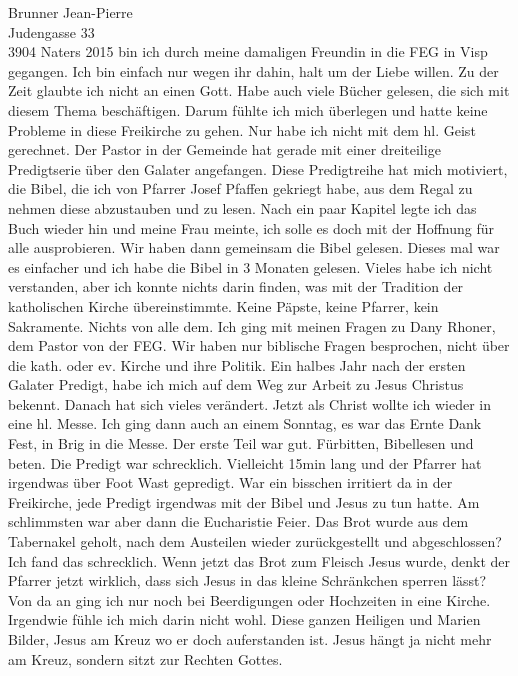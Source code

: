 \documentclass[
    12pt,
    a4paper,
    letter,
    parskip=yes,
    ]{scrlttr2}
\begin{document}
\begin{letter}{
Brunner Jean-Pierre\\
Judengasse 33\\
3904 Naters}
2015 bin ich durch meine damaligen Freundin in die FEG in Visp gegangen. Ich bin einfach nur wegen ihr dahin, halt um der Liebe willen. Zu der Zeit glaubte ich nicht an einen Gott. Habe auch viele Bücher gelesen, die sich mit diesem Thema beschäftigen. Darum fühlte ich mich überlegen und hatte keine Probleme in diese Freikirche zu gehen. Nur habe ich nicht mit dem hl. Geist gerechnet. Der Pastor in der Gemeinde hat gerade mit einer dreiteilige Predigtserie über den Galater angefangen. Diese Predigtreihe hat mich motiviert, die Bibel, die ich von Pfarrer Josef Pfaffen gekriegt habe, aus dem Regal zu nehmen diese abzustauben und zu lesen. Nach ein paar Kapitel legte ich das Buch wieder hin und meine Frau meinte, ich solle es doch mit der Hoffnung für alle ausprobieren. Wir haben dann gemeinsam die Bibel gelesen. Dieses mal war es einfacher und ich habe die Bibel in 3 Monaten gelesen. Vieles habe ich nicht verstanden, aber ich konnte nichts darin finden, was mit der Tradition der katholischen Kirche übereinstimmte. Keine Päpste, keine Pfarrer, kein Sakramente. Nichts von alle dem. Ich ging mit meinen Fragen zu Dany Rhoner, dem Pastor von der FEG. Wir haben nur biblische Fragen besprochen, nicht über die kath. oder ev. Kirche und ihre Politik. Ein halbes Jahr nach der ersten Galater Predigt, habe ich mich auf dem Weg zur Arbeit zu Jesus Christus bekennt. Danach hat sich vieles verändert. Jetzt als Christ wollte ich wieder in eine hl. Messe. Ich ging dann auch an einem Sonntag, es war das Ernte Dank Fest, in Brig in die Messe. Der erste Teil war gut. Fürbitten, Bibellesen und beten. Die Predigt war schrecklich. Vielleicht 15min lang und der Pfarrer hat irgendwas über Foot Wast gepredigt. War ein bisschen irritiert da in der Freikirche, jede Predigt irgendwas mit der Bibel und Jesus zu tun hatte. Am schlimmsten war aber dann die Eucharistie Feier. Das Brot wurde aus dem Tabernakel geholt, nach dem Austeilen wieder zurückgestellt und abgeschlossen? Ich fand das schrecklich. Wenn jetzt das Brot zum Fleisch Jesus wurde, denkt der Pfarrer jetzt wirklich, dass sich Jesus in das kleine Schränkchen sperren lässt? Von da an ging ich nur noch bei Beerdigungen oder Hochzeiten in eine Kirche. Irgendwie fühle ich mich darin nicht wohl. Diese ganzen Heiligen und Marien Bilder, Jesus am Kreuz wo er doch auferstanden ist. Jesus hängt ja nicht mehr am Kreuz, sondern sitzt zur Rechten Gottes.



\end{letter}
\end{document}
